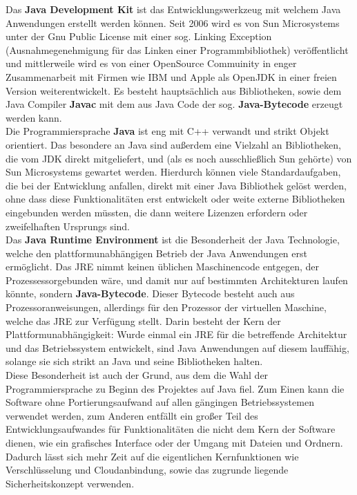 \documentclass[12pt,a4paper,bibliography=totocnumbered,listof=totocnumbered]{scrartcl}
\begin{document}
Das \textbf{Java Development Kit} ist das Entwicklungswerkzeug mit welchem Java Anwendungen erstellt werden können. Seit 2006 wird es von Sun Microsystems unter der Gnu Public License mit einer sog. Linking Exception (Ausnahmegenehmigung für das Linken einer Programmbibliothek) veröffentlicht und mittlerweile wird es von einer OpenSource Commuinity in enger Zusammenarbeit mit Firmen wie IBM und Apple als OpenJDK in einer freien Version weiterentwickelt. Es besteht hauptsächlich aus Bibliotheken, sowie dem Java Compiler \textbf{Javac} mit dem aus Java Code der sog. \textbf{Java-Bytecode} erzeugt werden kann.\\
Die Programmiersprache \textbf{Java} ist eng mit C++ verwandt und strikt Objekt orientiert. Das besondere an Java sind außerdem eine Vielzahl an Bibliotheken, die vom JDK direkt mitgeliefert, und (als es noch ausschließlich Sun gehörte) von Sun Microsystems gewartet werden. Hierdurch können viele Standardaufgaben, die bei der Entwicklung anfallen, direkt mit einer Java Bibliothek gelöst werden, ohne dass diese Funktionalitäten erst entwickelt oder weite externe Bibliotheken eingebunden werden müssten, die dann weitere Lizenzen erfordern oder zweifelhaften Ursprungs sind.\\
Das \textbf{Java Runtime Environment} ist die Besonderheit der Java Technologie, welche den plattformunabhängigen Betrieb der Java Anwendungen erst ermöglicht. Das  JRE nimmt keinen üblichen Maschinencode entgegen, der Prozessessorgebunden wäre, und damit nur auf bestimmten Architekturen laufen könnte, sondern \textbf{Java-Bytecode}. Dieser Bytecode besteht auch aus Prozessoranweisungen, allerdings für den Prozessor der virtuellen Maschine, welche das JRE zur Verfügung stellt. Darin besteht der Kern der Plattformunabhängigkeit: Wurde einmal ein JRE für die betreffende Architektur und das Betriebssystem entwickelt, sind Java Anwendungen auf diesem lauffähig, solange sie sich strikt an Java und seine Bibliotheken halten.\\
Diese Besonderheit ist auch der Grund, aus dem die Wahl der Programmiersprache zu Beginn des Projektes auf Java fiel. Zum Einen kann die Software ohne Portierungsaufwand auf allen gängingen Betriebssystemen verwendet werden, zum Anderen entfällt ein großer Teil des Entwicklungsaufwandes für Funktionalitäten die nicht dem Kern der Software dienen, wie ein grafisches Interface oder der Umgang mit Dateien und Ordnern. Dadurch lässt sich mehr Zeit auf die eigentlichen Kernfunktionen wie Verschlüsselung und Cloudanbindung,  sowie das zugrunde liegende Sicherheitskonzept verwenden. \cite{1}\cite{2}\\\cite{3}
\end{document}
